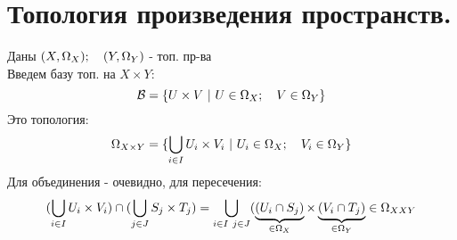 \documentclass[geometry.tex]{subfiles}
\begin{document}
  \section{Топология произведения пространств.}

  \begin{example} [конструкция]
      Даны $(X, \Omega_X); \q (Y, \Omega_Y)$ - топ. пр-ва\\
      Введем базу топ. на $X \times Y$:\\
      \[\B = \{U \times V \ |\ U \in \Omega_X; \q V \in \Omega_Y\}\]
      Это топология:
      \[\Omega_{X \times Y} = \{\bigcup_{i \in I} U_i \times V_i \ | \ U_i \in \Omega_X; \q V_i \in \Omega_Y\}\]
      Для объединения - очевидно, для пересечения:
      \[(\bigcup_{i \in I} U_i \times V_i) \cap (\bigcup_{j \in J} S_j \times T_j) =
      \bigcup_{i \in I \  j  \in J}
      (
          \ub{\in \Omega_X}{(U_i \cap S_j)}
          \times
          \ub{\in \Omega_Y}{(V_i \cap T_j
      )} \in \Omega_{XXY}\]
  \end{example}
\end{document}
